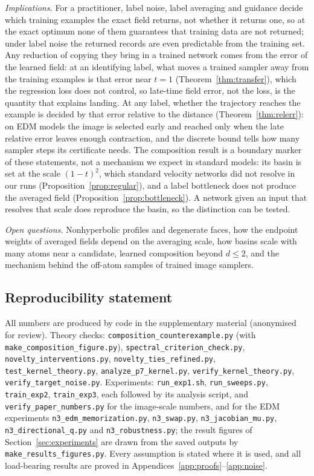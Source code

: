 \documentclass{article} %
\newif\ificlr
\theoremstyle{plain}
\theoremstyle{definition}
\theoremstyle{remark}
\begin{document}
\emph{Implications.} For a practitioner, label noise, label averaging and guidance decide which
training examples the exact field returns, not whether it returns one, so at the exact optimum
none of them guarantees that training data are not returned; under label noise the returned
records are even predictable from the training set. Any reduction of copying they bring in a
trained network comes from the error of the learned field: at an identifying label, what moves a
trained sampler away from the training examples is that error near $t=1$
(Theorem~\ref{thm:transfer}), which the regression loss does not control, so late-time field
error, not the loss, is the quantity that explains landing.
At any label, whether the trajectory reaches the example is decided by that error relative to
the distance (Theorem~\ref{thm:relerr}): on EDM models the image is selected early and reached
only when the late relative error leaves enough contraction, and the discrete bound tells how
many sampler steps its certificate needs. The composition result is a boundary marker of these statements, not a mechanism
we expect in standard models: its basin is set at the scale $(1-t)^2$, which standard velocity
networks did not resolve in our runs (Proposition~\ref{prop:regular}), and a label bottleneck does
not produce the averaged field (Proposition~\ref{prop:bottleneck}).\ificlr{} Open are nonhyperbolic
profiles, many atoms near a candidate, learned composition beyond $d\le2$, and the off-atom
samples of trained image samplers.\else{} A network given an
input that resolves that scale does reproduce the basin, so the distinction can be tested.

\emph{Open questions.} Nonhyperbolic profiles and degenerate faces, how the endpoint
weights of averaged fields depend on the averaging scale, how basins scale with many atoms near a
candidate, learned composition beyond $d\le2$, and the mechanism behind the off-atom samples of
trained image samplers.\fi\label{endmain}

\subsection*{Reproducibility statement}
All numbers are produced by code in the supplementary material (anonymised for review).
Theory checks: \texttt{composition\_counterexample.py} (with
\texttt{make\_composition\_figure.py}), \texttt{spectral\_criterion\_check.py}, \texttt{novelty\_interventions.py},
\texttt{novelty\_ties\_refined.py}, \texttt{test\_kernel\_theory.py},
\texttt{analyze\_p7\_kernel.py}, \texttt{verify\_kernel\_theory.py},
\texttt{verify\_target\_noise.py}. Experiments: \texttt{run\_exp1.sh}, \texttt{run\_sweeps.py},
\texttt{train\_exp2}, \texttt{train\_exp3}, each followed by its analysis script, and
\texttt{verify\_paper\_numbers.py} for the image-scale numbers, and for the EDM experiments
\texttt{n3\_edm\_memorization.py}, \texttt{n3\_swap.py}, \texttt{n3\_jacobian\_mu.py},
\texttt{n3\_directional\_q.py} and \texttt{n3\_robustness.py}; the result figures of
Section~\ref{sec:experiments} are drawn from the saved outputs by
\texttt{make\_results\_figures.py}. Every assumption is stated where
it is used, and all load-bearing results are proved in
Appendices~\ref{app:proofs}--\ref{app:noise}.
\end{document}
